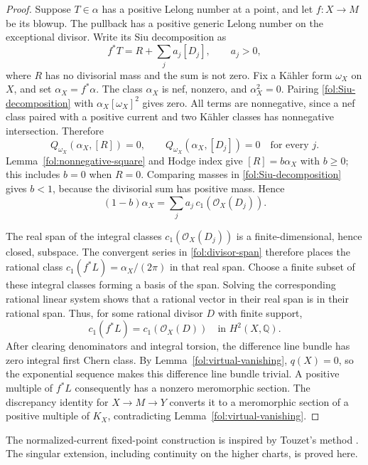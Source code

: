 \documentclass[11pt,letterpaper]{article}
\theoremstyle{definition}
\theoremstyle{remark}
\begin{document}
\begin{proof}
Suppose $T\in\alpha$ has a positive Lelong number at a point, and let
$f\colon X\to M$ be its blowup.  The pullback has a positive generic
Lelong number on the exceptional divisor.  Write its Siu decomposition
as
\begin{equation}\label{fol:Siu-decomposition}
 f^*T=R+\sum_j a_j[D_j],
 \qquad a_j>0,
\end{equation}
where $R$ has no divisorial mass and the sum is not zero.
Fix a K\"ahler form $\omega_X$ on $X$, and set $\alpha_X=f^*\alpha$.
The class $\alpha_X$ is nef, nonzero, and
$\alpha_X^2=0$.  Pairing \eqref{fol:Siu-decomposition} with
$\alpha_X[\omega_X]^2$ gives zero.  All terms are nonnegative,
since a nef class paired with a positive current and two K\"ahler
classes has nonnegative intersection.  Therefore
\[
 Q_{\omega_X}(\alpha_X,[R])=0,\qquad
 Q_{\omega_X}(\alpha_X,[D_j])=0
 \quad\text{for every }j.
\]
Lemma~\ref{fol:nonnegative-square} and Hodge index give
$[R]=b\alpha_X$ with $b\geq0$; this includes $b=0$ when $R=0$.
Comparing masses in \eqref{fol:Siu-decomposition} gives $b<1$,
because the divisorial sum has positive mass.  Hence
\begin{equation}\label{fol:divisor-span}
 (1-b)\alpha_X=\sum_j a_j\,c_1(\mathcal{O}_X(D_j)).
\end{equation}

The real span of the integral classes $c_1(\mathcal{O}_X(D_j))$ is a
finite-dimensional, hence closed, subspace.  The convergent series in
\eqref{fol:divisor-span} therefore places the rational class
$c_1(f^*L)=\alpha_X/(2\pi)$ in that real span.  Choose a finite subset
of these integral classes forming a basis of the span.  Solving the
corresponding rational linear system shows that a rational vector in
their real span is in their rational span.  Thus, for some rational
divisor $D$ with finite support,
\[
 c_1(f^*L)=c_1(\mathcal{O}_X(D))
 \quad\text{in }H^2(X,\mathbb{Q}).
\]
After clearing denominators and integral torsion, the difference line
bundle has zero integral first Chern class.  By
Lemma~\ref{fol:virtual-vanishing}, $q(X)=0$, so the exponential sequence
makes this difference line bundle trivial.  A positive multiple of
$f^*L$ consequently has a nonzero meromorphic section.  The discrepancy
identity for $X\to M\to Y$ converts it to a meromorphic section of a
positive multiple of $K_X$, contradicting
Lemma~\ref{fol:virtual-vanishing}.
\end{proof}

The normalized-current fixed-point construction is inspired by Touzet's
method \cite{Touzet2014}.  The singular extension, including continuity
on the higher charts, is proved here.
\end{document}
